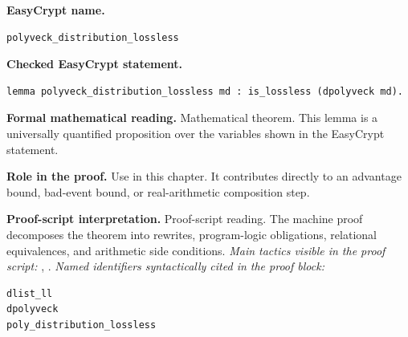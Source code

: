 \begin{formaltheorem}
\noindent\textbf{EasyCrypt name.}
\begin{lstlisting}[language=EasyCrypt,basicstyle=\ttfamily\scriptsize]
polyveck_distribution_lossless
\end{lstlisting}
\noindent\textbf{Checked EasyCrypt statement.}
\begin{lstlisting}[language=EasyCrypt,basicstyle=\ttfamily\scriptsize]
lemma polyveck_distribution_lossless md : is_lossless (dpolyveck md).
\end{lstlisting}
\noindent\textbf{Formal mathematical reading.}
Mathematical theorem. This lemma is a universally quantified proposition over the variables shown in the EasyCrypt statement.

\noindent\textbf{Role in the proof.}
Use in this chapter. It contributes directly to an advantage bound, bad-event bound, or real-arithmetic composition step.

\noindent\textbf{Proof-script interpretation.}
Proof-script reading. The machine proof decomposes the theorem into rewrites, program-logic obligations, relational equivalences, and arithmetic side conditions.
\emph{Main tactics visible in the proof script:} , .
\emph{Named identifiers syntactically cited in the proof block:}
\begin{lstlisting}[language=EasyCrypt,basicstyle=\ttfamily\scriptsize]
dlist_ll
dpolyveck
poly_distribution_lossless
\end{lstlisting}

\end{formaltheorem}

